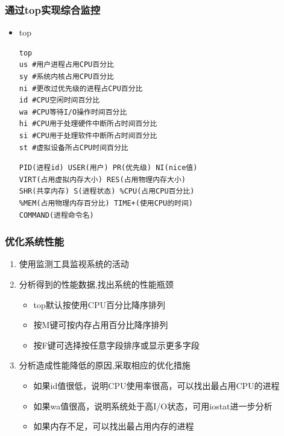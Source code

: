 \documentclass[xcolor=svgnames,presentation]{beamer}
\begin{document}
\begin{frame}[fragile]
\frametitle{通过top实现综合监控}
\label{sec-5-4}
\begin{itemize}

\item top\\
\label{sec-5-4-1}%
\begin{verbatim}
top
us #用户进程占用CPU百分比
sy #系统内核占用CPU百分比
ni #更改过优先级的进程占CPU百分比
id #CPU空闲时间百分比
wa #CPU等待I/O操作时间百分比
hi #CPU用于处理硬件中断所占时间百分比
si #CPU用于处理软件中断所占时间百分比
st #虚拟设备所占CPU时间百分比
\end{verbatim}

\begin{verbatim}
PID(进程id) USER(用户) PR(优先级) NI(nice值)
VIRT(占用虚拟内存大小) RES(占用物理内存大小)
SHR(共享内存) S(进程状态) %CPU(占用CPU百分比)
%MEM(占用物理内存百分比) TIME+(使用CPU的时间)
COMMAND(进程命令名)
\end{verbatim}
\end{itemize} %
\end{frame}
\begin{frame}
\frametitle{优化系统性能}
\label{sec-5-5}

\begin{enumerate}
\item 使用监测工具监视系统的活动
\item 分析得到的性能数据,找出系统的性能瓶颈
\begin{itemize}
\item top默认按使用CPU百分比降序排列
\item 按M键可按内存占用百分比降序排列
\item 按F键可选择按任意字段排序或显示更多字段
\end{itemize}
\item 分析造成性能降低的原因,采取相应的优化措施
\begin{itemize}
\item 如果id值很低，说明CPU使用率很高，可以找出最占用CPU的进程
\item 如果wa值很高，说明系统处于高I/O状态，可用iostat进一步分析
\item 如果内存不足，可以找出最占用内存的进程
\end{itemize}
\end{enumerate}
\end{frame}
\end{document}
